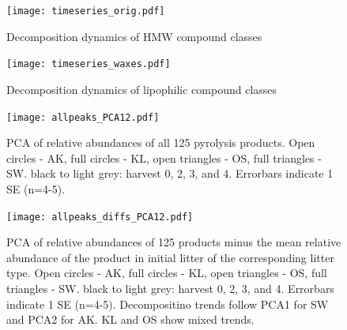 \newpage
\begin{figure}[p]
\vspace*{2mm}
  \begin{center}
\texttt{[image: timeseries\_orig.pdf]}
\end{center}
\caption{Decomposition dynamics of HMW compound classes}
\end{figure}

\newpage 
\begin{figure}[p]
\vspace*{2mm}
  \begin{center}
\texttt{[image: timeseries\_waxes.pdf]}
\end{center}
\caption{Decomposition dynamics of lipophilic compound classes}
\end{figure}


\newpage
\begin{figure}[p]
\vspace*{2mm}
\begin{center}
\texttt{[image: allpeaks\_PCA12.pdf]}
\end{center}
\caption{PCA of relative abundances of all 125 pyrolysis products. Open circles - AK, full circles - KL, open triangles - OS, full triangles - SW. black to light grey: harvest 0, 2, 3, and 4. Errorbars indicate 1 SE (n=4-5).}
\end{figure}

\newpage
\begin{figure}[p]
\vspace*{2mm}
\begin{center}
\texttt{[image: allpeaks\_diffs\_PCA12.pdf]}
\end{center}
\caption{PCA of relative abundances of 125 products minus the mean relative abundance of the product in initial litter of the corresponding litter type. Open circles - AK, full circles - KL, open triangles - OS, full triangles - SW. black to light grey: harvest 0, 2, 3, and 4. Errorbars indicate 1 SE (n=4-5). Decompositino trends follow PCA1 for SW and PCA2 for AK. KL and OS show mixed trends.}
\end{figure}



% 
% 
% 
% 

